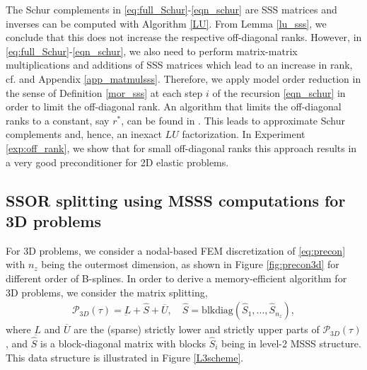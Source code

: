 {The Schur complements in \eqref{eq:full_Schur}-\eqref{eqn_schur} are SSS matrices and inverses can be computed with Algorithm \ref{LU}. From Lem\-ma \ref{lu_sss}, we conclude that this does not increase the respective off-diagonal ranks. However, in \eqref{eq:full_Schur}-\eqref{eqn_schur}, we also need to perform matrix-matrix multiplications and additions of SSS matrices which lead to an increase in rank, cf. \cite{CD05} and Appendix \ref{app_matmulsss}. Therefore, we apply model order reduction in the sense of Definition \ref{mor_sss} at each step $i$ of the recursion \eqref{eqn_schur} in order to limit the off-diagonal rank. An algorithm that limits the off-diagonal ranks to a constant, say $r^\ast$, can be found in \cite{QG15}. This leads to approximate Schur complements and, hence, an inexact $LU$ factorization. In Experiment \ref{exp:off_rank}, we show that for small off-diagonal ranks this approach results in a very good preconditioner for 2D elastic problems.

\subsection{SSOR splitting using MSSS computations for 3D problems}
\label{ch_msss3d}
For 3D problems, we consider a nodal-based FEM discretization of \eqref{eq:precon} with $n_z$ being the outermost dimension, as shown in Figure \ref{fig:precon3d} for different order of B-splines. In order to derive a memory-efficient algorithm for 3D problems, we consider the matrix splitting,
\begin{align}
\label{eq:splitting}
\mathcal{P}_{3D}(\tau) = \underbar{L} + \hat{S} + \overbar{U}, \quad \hat{S} = \text{blkdiag}(\hat{S}_1,...,\hat{S}_{n_z}),
\end{align}
where $\underbar{L}$ and $\overbar{U}$ are the (sparse) strictly lower and strictly upper parts of $\mathcal{P}_{3D}(\tau)$, and $\hat{S}$ is a block-diagonal matrix with blocks $\hat{S}_i$ being in level-2 MSSS structure. This data structure is illustrated in Figure \ref{L3scheme}.

}
